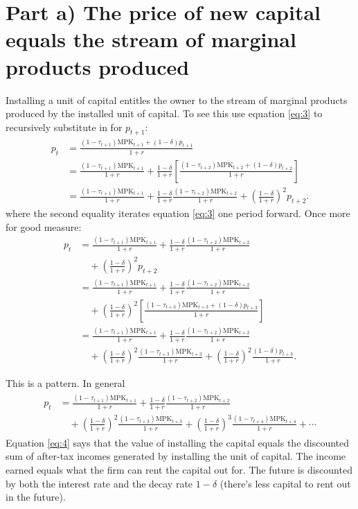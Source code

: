 \documentclass[12pt]{pracjourn_rwr}
\theoremstyle{definition}
\theoremstyle{remark}
\begin{document}
\section{Part a) The price of new capital equals the stream of marginal products produced}

Installing a unit of capital entitles the owner to the stream of marginal products produced by the installed unit of capital.
To see this use equation \eqref{eq:3} to recursively substitute in for $p_{t+1}$:
\begin{align*}
p_{t} &= \frac{(1-\tau_{t+1}) \text{MPK}_{t+1} + (1-\delta)p_{t+1}}{1+r} \\
&= \frac{(1-\tau_{t+1}) \text{MPK}_{t+1}}{1+r} + \frac{1-\delta}{1+r}
\left[ \frac{(1-\tau_{t+2}) \text{MPK}_{t+2} + (1-\delta)p_{t+2}}{1+r} \right] \\
&= \frac{(1-\tau_{t+1}) \text{MPK}_{t+1}}{1+r} + \frac{1-\delta}{1+r} \frac{(1-\tau_{t+2}) \text{MPK}_{t+2}}{1+r} +
\left( \frac{1-\delta}{1+r}  \right)^{2} p_{t+2}.
\end{align*}
where the second equality iterates equation \eqref{eq:3} one period forward.
Once more for good measure:
\begin{align*}
p_{t} &= \frac{(1-\tau_{t+1}) \text{MPK}_{t+1}}{1+r} + \frac{1-\delta}{1+r} \frac{(1-\tau_{t+2}) \text{MPK}_{t+2}}{1+r} \\
&\quad + \left( \frac{1-\delta}{1+r}  \right)^{2} p_{t+2} \\
&= \frac{(1-\tau_{t+1}) \text{MPK}_{t+1}}{1+r} + \frac{1-\delta}{1+r} \frac{(1-\tau_{t+2}) \text{MPK}_{t+2}}{1+r} \\
&\quad + \left( \frac{1-\delta}{1+r}  \right)^{2} \left[ \frac{(1-\tau_{t+3}) \text{MPK}_{t+3} + (1-\delta)p_{t+3}}{1+r} \right] \\
&= \frac{(1-\tau_{t+1}) \text{MPK}_{t+1}}{1+r} + \frac{1-\delta}{1+r} \frac{(1-\tau_{t+2}) \text{MPK}_{t+2}}{1+r} \\
&\quad + \left( \frac{1-\delta}{1+r}  \right)^{2} \frac{(1-\tau_{t+3}) \text{MPK}_{t+3}}{1+r}
+ \left( \frac{1-\delta}{1+r}  \right)^{2} \frac{(1-\delta)p_{t+3}}{1+r}.
\end{align*}

This is a pattern.
In general
\begin{align}
\label{eq:4}
\begin{split}
p_{t} &= \frac{(1-\tau_{t+1}) \text{MPK}_{t+1}}{1+r} + \frac{1-\delta}{1+r} \frac{(1-\tau_{t+2}) \text{MPK}_{t+2}}{1+r} \\
&\quad + \left( \frac{1-\delta}{1+r}  \right)^{2} \frac{(1-\tau_{t+3}) \text{MPK}_{t+3}}{1+r}
+ \left( \frac{1-\delta}{1+r}  \right)^{3} \frac{(1-\tau_{t+4}) \text{MPK}_{t+4}}{1+r} + \cdots
\end{split}
\end{align}
Equation \eqref{eq:4} says that the value of installing the capital equals the discounted sum of after-tax incomes generated by installing the unit of capital.
The income earned equals what the firm can rent the capital out for.
The future is discounted by both the interest rate and the decay rate $1-\delta$ (there's less capital to rent out in the future).
\end{document}
